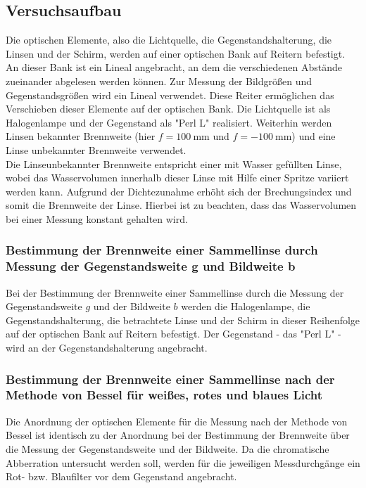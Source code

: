 \subsection{Versuchsaufbau}
\label{sec:Versuchsaufbau}

Die optischen Elemente, also die Lichtquelle, die Gegenstandshalterung, die Linsen und der
Schirm,
werden auf einer optischen Bank auf Reitern befestigt. An dieser Bank ist ein Lineal angebracht,
an dem die verschiedenen Abstände zueinander abgelesen werden können.
Zur Messung der Bildgrößen und Gegenstandsgrößen wird ein Lineal verwendet.
Diese Reiter ermöglichen das Verschieben dieser Elemente auf der optischen Bank.
Die Lichtquelle ist als Halogenlampe und der Gegenstand als "Perl L" realisiert.
Weiterhin werden Linsen bekannter Brennweite (hier $f=\SI{100}{\milli\meter}$ und
$f=-\SI{100}{\milli\meter}$) und eine Linse unbekannter Brennweite verwendet. \\
Die Linseunbekannter Brennweite entspricht einer mit Wasser gefüllten Linse, wobei das Wasservolumen
innerhalb dieser Linse mit Hilfe einer Spritze variiert werden kann. Aufgrund der
Dichtezunahme erhöht sich der Brechungsindex und somit die Brennweite der Linse.
Hierbei ist zu beachten, dass das Wasservolumen bei einer Messung konstant gehalten wird.

\subsubsection{Bestimmung der Brennweite einer Sammellinse durch Messung der Gegenstandsweite g und Bildweite b}
\label{sec:gundb}
Bei der Bestimmung der Brennweite einer Sammellinse durch die Messung der Gegenstandsweite $g$ und
der Bildweite $b$ werden die Halogenlampe, die Gegenstandshalterung, die betrachtete
Linse und der Schirm
in dieser Reihenfolge auf der optischen Bank auf Reitern befestigt.
Der Gegenstand - das "Perl L" - wird an der Gegenstandshalterung angebracht.

\subsubsection{Bestimmung der Brennweite einer Sammellinse nach der Methode von Bessel für
weißes, rotes und blaues Licht}
\label{sec:bessel}
Die Anordnung der optischen Elemente für die Messung nach der Methode von Bessel ist identisch
zu der Anordnung bei der Bestimmung der Brennweite über die Messung der Gegenstandsweite und der
Bildweite.
Da die chromatische Abberration untersucht werden soll, werden für die jeweiligen
Messdurchgänge ein Rot- bzw. Blaufilter vor dem Gegenstand angebracht.

